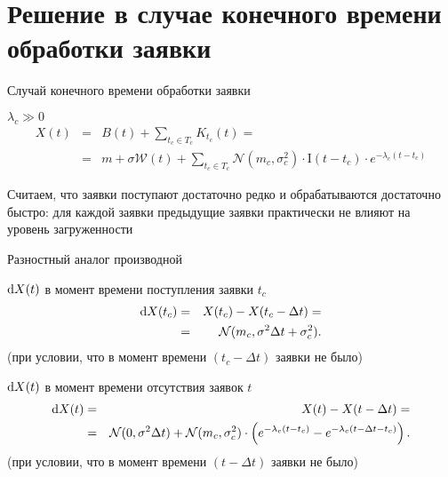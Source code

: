 \documentclass[utf8]{beamer}
\begin{document}
\section[$\lambda_c \gg 0$]{Решение в случае конечного времени обработки заявки}
\begin{frame}{Случай конечного времени обработки заявки}
\begin{block}{$\lambda_c \gg 0$}
\begin{eqnarray*}
X(t) 
  &=& B(t) + \sum\limits_{t_c \in T_c}K_{t_c}(t) = \\
  &=& m + \sigma \mathcal{W}(t) + \sum\limits_{t_c \in T_c}
    \mathcal{N}(m_c, \sigma_c^2) \cdot \mathrm{I}(t - t_c) \cdot 
    e^{-\lambda_c(t - t_c)}
\end{eqnarray*}
\end{block}
Считаем, что заявки поступают достаточно редко и 
обрабатываются достаточно быстро: 
для каждой заявки предыдущие заявки практически не влияют на уровень
загруженности
\end{frame}


\begin{frame}{Разностный аналог производной}
\begin{block}{$\dif X(t)$ в момент времени поступления заявки $t_c$}
  \begin{eqnarray*}
  \dif X(t_c) 
    & = & X(t_c) - X(t_c - \Delta t) = \\
    & = & \mathcal{N}(m_c, \sigma^2 \Delta t + \sigma_c^2).
  \end{eqnarray*}
  (при условии, что в момент времени $(t_c - \Delta t)$ заявки не было)
\end{block}
\begin{block}{$\dif X(t)$ в момент времени отсутствия заявок $t$}
  \begin{eqnarray*}
  \dif X(t) 
    & = & X(t) - X(t - \Delta t) = \\
    & = & \mathcal{N}(0, \sigma^2 \Delta t) + 
        \mathcal{N}(m_c, \sigma_c^2) \cdot 
          \del{e^{-\lambda_c(t - t_c)} - e^{-\lambda_c(t - \Delta t - t_c)}}.
  \end{eqnarray*}
  (при условии, что в момент времени $(t - \Delta t)$ заявки не было)
\end{block}
\end{frame}
\end{document}
